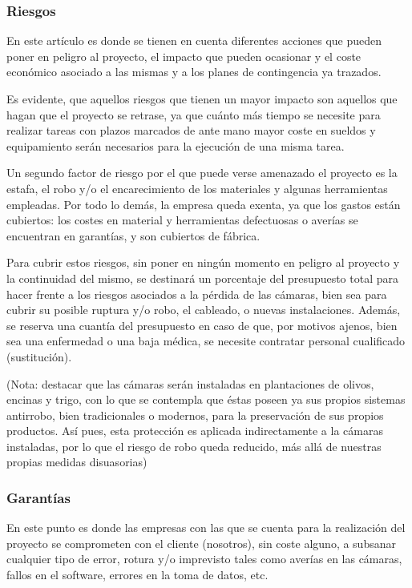 \documentclass[12pt,oneside,a4paper]{article}
\numberwithin{figure}{section}
\begin{document}
\subsubsection{Riesgos}

En este artículo es donde se tienen en cuenta diferentes acciones que pueden poner en peligro al proyecto, el impacto que pueden ocasionar y el coste económico asociado a las mismas y a los planes de contingencia ya trazados.

Es evidente, que aquellos riesgos que tienen un mayor impacto son aquellos que hagan que el proyecto se retrase, ya que cuánto más tiempo se necesite para realizar tareas con  plazos marcados de ante mano mayor coste en sueldos y equipamiento serán necesarios para la ejecución de una misma tarea.

Un segundo factor de riesgo por el que puede verse amenazado el proyecto es la estafa, el robo y/o el encarecimiento de los materiales y algunas herramientas empleadas. Por todo lo demás, la empresa queda exenta, ya que los gastos están cubiertos: los costes en material y herramientas defectuosas o averías se encuentran en garantías, y son cubiertos de fábrica.

Para cubrir estos riesgos, sin poner en ningún momento en peligro al proyecto y la continuidad del mismo, se destinará un porcentaje del presupuesto total para hacer frente a los riesgos asociados a la pérdida de las cámaras, bien sea para cubrir su posible ruptura y/o robo, el cableado, o nuevas instalaciones. Además, se reserva una cuantía del presupuesto en caso de que, por motivos ajenos, bien sea una enfermedad o una baja médica, se necesite contratar personal cualificado (sustitución).

(Nota: destacar que las cámaras serán instaladas en plantaciones de olivos, encinas y trigo, con lo que se contempla que éstas poseen ya sus propios sistemas antirrobo, bien tradicionales o modernos, para la preservación de sus propios productos. Así pues, esta protección es aplicada indirectamente a la cámaras instaladas, por lo que el riesgo de robo queda reducido, más allá de nuestras propias medidas disuasorias)


\subsubsection{Garantías}

En este punto es donde las empresas con las que se cuenta para la realización del proyecto se comprometen con el cliente (nosotros), sin coste alguno, a subsanar cualquier tipo de error, rotura y/o imprevisto tales como averías en las cámaras, fallos en el software, errores en la toma de datos, etc.
\end{document}
